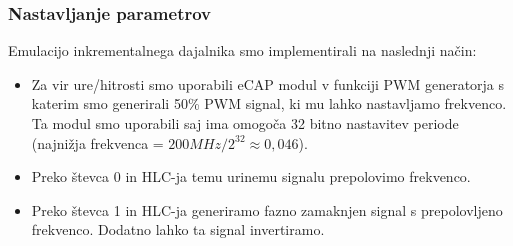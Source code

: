 \documentclass[a4paper]{article}
\begin{document}
\begin{sloppypar}
\subsubsection{Nastavljanje parametrov}\label{sec:nastavljanje_clb}
Emulacijo inkrementalnega dajalnika smo implementirali na naslednji način:
\begin{itemize}
    \item Za vir ure/hitrosti smo uporabili eCAP modul v funkciji PWM
        generatorja s katerim smo generirali 50\% PWM signal, ki mu lahko
        nastavljamo frekvenco. Ta modul smo uporabili saj ima omogoča 32 bitno
        nastavitev periode (najnižja frekvenca = $200MHz/2^{32} \approx
        0,046$).
    \item Preko števca 0 in HLC-ja temu urinemu signalu prepolovimo frekvenco.
    \item Preko števca 1 in HLC-ja generiramo fazno zamaknjen signal s
        prepolovljeno frekvenco. Dodatno lahko ta signal invertiramo.
\end{itemize}


\end{sloppypar}
\end{document}
